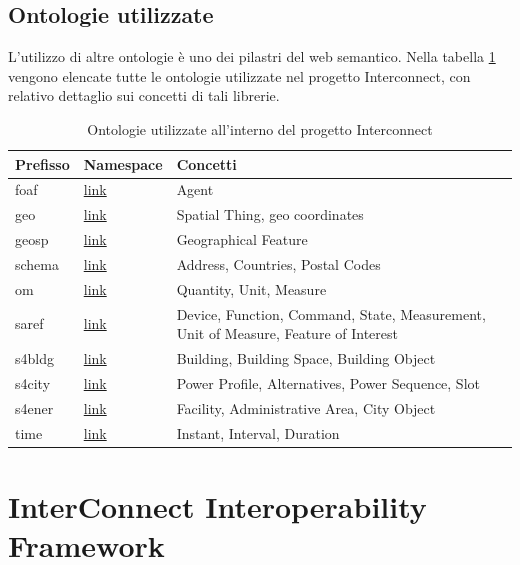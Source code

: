 \subsection{Ontologie utilizzate}
L'utilizzo di altre ontologie è uno dei pilastri del web semantico. Nella tabella \ref{tab:ontologieUtilizzate} vengono elencate tutte le ontologie utilizzate nel progetto Interconnect, con relativo dettaglio sui concetti di tali librerie.
\begin{table}[H]
    \centering
    \begin{tabularx}{\textwidth}{|X|X|X|}
        \hline
        Prefisso & Namespace                                                               & Concetti                                                                            \\
        \hline
        foaf     & \href{http://xmlns.com/foaf/0.1/}{link}                                 & Agent                                                                               \\
        geo      & \href{http://www.w3.org/2003/01/geo/wgs84_pos}{link}                    & Spatial Thing, geo coordinates                                                      \\
        geosp    & \href{http://www.opengis.net/ont/geosparql}{link}                       & Geographical Feature                                                                \\
        schema   & \href{https://schema.org/}{link}                                        & Address, Countries, Postal Codes                                                    \\
        om       & \href{http://www.ontology-of-units-of-measure.org/resource/om-2/}{link} & Quantity, Unit, Measure                                                             \\
        saref    & \href{https://saref.etsi.org/core/}{link}                               & Device, Function, Command, State, Measurement, Unit of Measure, Feature of Interest \\
        s4bldg   & \href{https://saref.etsi.org/saref4bldg/}{link}                         & Building, Building Space, Building Object                                           \\
        s4city   & \href{https://saref.etsi.org/saref4ener/}{link}                         & Power Profile, Alternatives, Power Sequence, Slot                                   \\
        s4ener   & \href{https://saref.etsi.org/saref4city/}{link}                         & Facility, Administrative Area, City Object                                          \\
        time     & \href{http://www.w3.org/2006/time}{link}                                & Instant, Interval, Duration                                                         \\
        \hline
    \end{tabularx}
    \caption{Ontologie utilizzate all'interno del progetto Interconnect}
    \label{tab:ontologieUtilizzate}
\end{table}

\section{InterConnect Interoperability Framework}